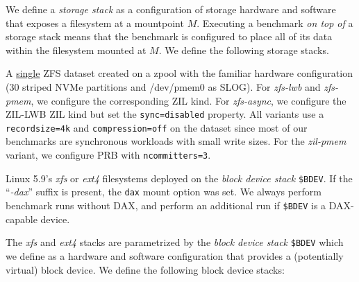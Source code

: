 \documentclass[12pt,a4paper,twoside]{book}
\begin{document}
We define a \textit{storage stack} as a configuration of storage hardware and software that exposes a filesystem at a mountpoint $M$.
Executing a benchmark \textit{on top of} a storage stack means that the benchmark is configured to place all of its data within the filesystem mounted at $M$.
We define the following storage stacks.
\begin{description}[noitemsep,leftmargin=1.5cm,labelindent=1cm]
    \item[zfs-\{lwb,pmem,async\}] A \underline{single} ZFS dataset created on a zpool with the familiar hardware configuration (30 striped NVMe partitions and /dev/pmem0 as SLOG).
        For \textit{zfs-lwb} and \textit{zfs-pmem}, we configure the corresponding ZIL kind.
        For \textit{zfs-async}, we configure the ZIL-LWB ZIL kind but set the \lstinline{sync=disabled} property.
        All variants use a \lstinline{recordsize=4k} and \lstinline{compression=off} on the dataset since most of our benchmarks are synchronous workloads with small write sizes.
        For the \textit{zil-pmem} variant, we configure PRB with \lstinline{ncommitters=3}.
    \item[\{xfs,ext4\}\{,-dax\} on \$BDEV] Linux 5.9's \textit{xfs} or \textit{ext4} filesystems deployed on the \textit{block device stack} \lstinline{$BDEV}.
        If the ``\textit{-dax}'' suffix is present, the \lstinline{dax} mount option was set.
        We always perform benchmark runs without DAX, and perform an additional run if \lstinline{$BDEV} is a DAX-capable device.
\end{description}
The \textit{xfs} and \textit{ext4} stacks are parametrized by the \textit{block device stack} \lstinline{$BDEV} which we define as a hardware and software configuration that provides a (potentially virtual) block device.
We define the following block device stacks:
\end{document}
